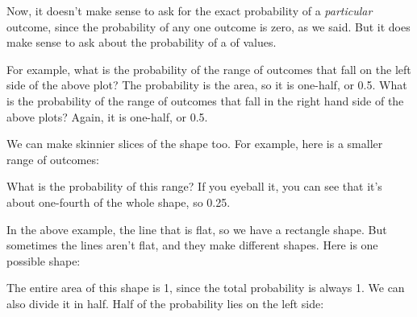 \documentclass[../../../main.tex]{subfiles}
\begin{document}
\noindent
Now, it doesn't make sense to ask for the exact probability of a \emph{particular} outcome, since the probability of any one outcome is zero, as we said. But it does make sense to ask about the probability of a  of values. 

For example, what is the probability of the range of outcomes that fall on the left side of the above plot? The probability is the area, so it is one-half, or 0.5. What is the probability of the range of outcomes that fall in the right hand side of the above plots? Again, it is one-half, or 0.5. 

We can make skinnier slices of the shape too. For example, here is a smaller range of outcomes:

\begin{center}
\end{center}

\noindent
What is the probability of this range? If you eyeball it, you can see that it's about one-fourth of the whole shape, so 0.25. 

In the above example, the line that is flat, so we have a rectangle shape. But sometimes the lines aren't flat, and they make different shapes. Here is one possible shape:

\begin{center}
\end{center}

\noindent
The entire area of this shape is 1, since the total probability is always 1. We can also divide it in half. Half of the probability lies on the left side:
\end{document}
